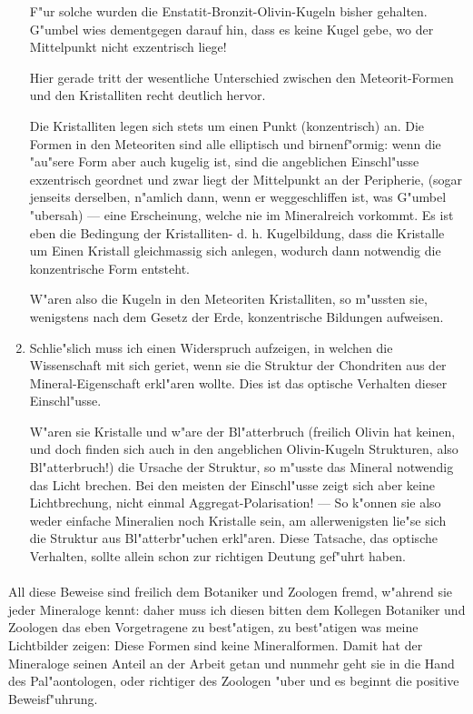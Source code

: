 \documentclass[a4paper, 11pt, oneside]{article}
\begin{document}
\begin{enumerate}
F"ur solche wurden die Enstatit-Bronzit-Olivin-Kugeln bisher gehalten. G"umbel wies dementgegen darauf hin, dass es keine Kugel gebe, wo der Mittelpunkt nicht exzentrisch liege!

Hier gerade tritt der wesentliche Unterschied zwischen den Meteorit-Formen und den Kristalliten recht deutlich hervor.

Die Kristalliten legen sich stets um einen Punkt (konzentrisch) an. Die Formen in den Meteoriten sind alle elliptisch und birnenf"ormig: wenn die "au"sere Form aber auch kugelig ist, sind die angeblichen Einschl"usse exzentrisch geordnet und zwar liegt der Mittelpunkt an der Peripherie, (sogar jenseits derselben, n"amlich dann, wenn er weggeschliffen ist, was G"umbel "ubersah) --- eine Erscheinung, welche nie im Mineralreich vorkommt. Es ist eben die Bedingung der Kristalliten- d. h. Kugelbildung, dass die Kristalle um Einen Kristall gleichmassig sich anlegen, wodurch dann notwendig die konzentrische Form entsteht.

W"aren also die Kugeln in den Meteoriten Kristalliten, so m"ussten sie, wenigstens nach dem Gesetz der Erde, konzentrische Bildungen aufweisen.
\item Schlie"slich muss ich einen Widerspruch aufzeigen, in welchen die Wissenschaft mit sich geriet, wenn sie die Struktur der Chondriten aus der Mineral-Eigenschaft erkl"aren wollte. Dies ist das optische Verhalten dieser Einschl"usse.

W"aren sie Kristalle und w"are der Bl"atterbruch (freilich Olivin hat keinen, und doch finden sich auch in den angeblichen Olivin-Kugeln Strukturen, also Bl"atterbruch!) die Ursache der Struktur, so m"usste das Mineral notwendig das Licht brechen. Bei den meisten der Einschl"usse zeigt sich aber keine Lichtbrechung, nicht einmal Aggregat-Polarisation! --- So k"onnen sie also weder einfache Mineralien noch Kristalle sein, am allerwenigsten lie"se sich die Struktur aus Bl"atterbr"uchen erkl"aren. Diese Tatsache, das optische Verhalten, sollte allein schon zur richtigen Deutung gef"uhrt haben.
\end{enumerate}
\paragraph{}
All diese Beweise sind freilich dem Botaniker und Zoologen fremd, w"ahrend sie jeder Mineraloge kennt: daher muss ich diesen bitten dem Kollegen Botaniker und Zoologen das eben Vorgetragene zu best"atigen, zu best"atigen was meine Lichtbilder zeigen: Diese Formen sind keine Mineralformen. Damit hat der Mineraloge seinen Anteil an der Arbeit getan und nunmehr geht sie in die Hand des Pal"aontologen, oder richtiger des Zoologen "uber und es beginnt die positive Beweisf"uhrung.
\clearpage
\end{document}
